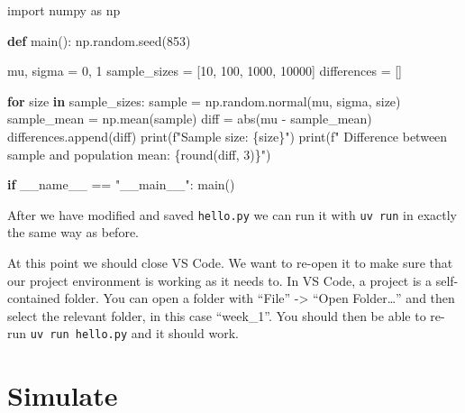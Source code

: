 \documentclass[
  letterpaper,
  DIV=11,
  numbers=noendperiod]{scrartcl}
\newenvironment{Shaded}{\begin{snugshade}}{\end{snugshade}}
\newcommand{\BuiltInTok}[1]{\textcolor[rgb]{0.00,0.23,0.31}{#1}}
\newcommand{\ControlFlowTok}[1]{\textcolor[rgb]{0.00,0.23,0.31}{\textbf{#1}}}
\newcommand{\DecValTok}[1]{\textcolor[rgb]{0.68,0.00,0.00}{#1}}
\newcommand{\ImportTok}[1]{\textcolor[rgb]{0.00,0.46,0.62}{#1}}
\newcommand{\KeywordTok}[1]{\textcolor[rgb]{0.00,0.23,0.31}{\textbf{#1}}}
\newcommand{\NormalTok}[1]{\textcolor[rgb]{0.00,0.23,0.31}{#1}}
\newcommand{\OperatorTok}[1]{\textcolor[rgb]{0.37,0.37,0.37}{#1}}
\newcommand{\SpecialCharTok}[1]{\textcolor[rgb]{0.37,0.37,0.37}{#1}}
\newcommand{\SpecialStringTok}[1]{\textcolor[rgb]{0.13,0.47,0.30}{#1}}
\newcommand{\StringTok}[1]{\textcolor[rgb]{0.13,0.47,0.30}{#1}}
\newcommand{\VariableTok}[1]{\textcolor[rgb]{0.07,0.07,0.07}{#1}}
\begin{document}
\begin{Shaded}
\begin{Highlighting}[]
\ImportTok{import}\NormalTok{ numpy }\ImportTok{as}\NormalTok{ np}

\KeywordTok{def}\NormalTok{ main():}
\NormalTok{    np.random.seed(}\DecValTok{853}\NormalTok{)}

\NormalTok{    mu, sigma }\OperatorTok{=} \DecValTok{0}\NormalTok{, }\DecValTok{1}
\NormalTok{    sample\_sizes }\OperatorTok{=}\NormalTok{ [}\DecValTok{10}\NormalTok{, }\DecValTok{100}\NormalTok{, }\DecValTok{1000}\NormalTok{, }\DecValTok{10000}\NormalTok{]}
\NormalTok{    differences }\OperatorTok{=}\NormalTok{ []}

    \ControlFlowTok{for}\NormalTok{ size }\KeywordTok{in}\NormalTok{ sample\_sizes:}
\NormalTok{        sample }\OperatorTok{=}\NormalTok{ np.random.normal(mu, sigma, size)}
\NormalTok{        sample\_mean }\OperatorTok{=}\NormalTok{ np.mean(sample)}
\NormalTok{        diff }\OperatorTok{=} \BuiltInTok{abs}\NormalTok{(mu }\OperatorTok{{-}}\NormalTok{ sample\_mean)}
\NormalTok{        differences.append(diff)}
        \BuiltInTok{print}\NormalTok{(}\SpecialStringTok{f"Sample size: }\SpecialCharTok{\{}\NormalTok{size}\SpecialCharTok{\}}\SpecialStringTok{"}\NormalTok{)}
        \BuiltInTok{print}\NormalTok{(}\SpecialStringTok{f"  Difference between sample and population mean: }\SpecialCharTok{\{}\BuiltInTok{round}\NormalTok{(diff, }\DecValTok{3}\NormalTok{)}\SpecialCharTok{\}}\SpecialStringTok{"}\NormalTok{)}
        
\ControlFlowTok{if} \VariableTok{\_\_name\_\_} \OperatorTok{==} \StringTok{"\_\_main\_\_"}\NormalTok{:}
\NormalTok{    main()}
\end{Highlighting}
\end{Shaded}

After we have modified and saved \texttt{hello.py} we can run it with
\texttt{uv\ run} in exactly the same way as before.

At this point we should close VS Code. We want to re-open it to make
sure that our project environment is working as it needs to. In VS Code,
a project is a self-contained folder. You can open a folder with
``File'' -\textgreater{} ``Open Folder\ldots{}'' and then select the
relevant folder, in this case ``week\_1''. You should then be able to
re-run \texttt{uv\ run\ hello.py} and it should work.

\section{Simulate}\label{simulate}
\end{document}
